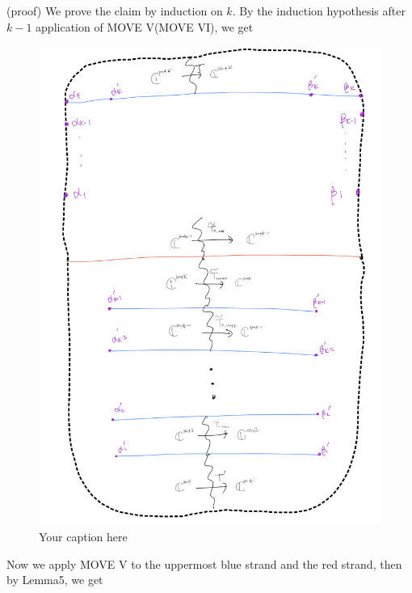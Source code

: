 (proof) We prove the claim by induction on $k$. By the induction hypothesis after $k-1$ application of MOVE \RN{5}(MOVE \RN{6}), we get 
\begin{figure}[H] %
    \centering
    \includegraphics[width=\linewidth]{diagrams/lemma6/3.png} %
    \caption{Your caption here}
    \label{fig:your-label}
\end{figure}

Now we apply MOVE \RN{5} to the uppermost blue strand and the red strand, then by Lemma5, we get

